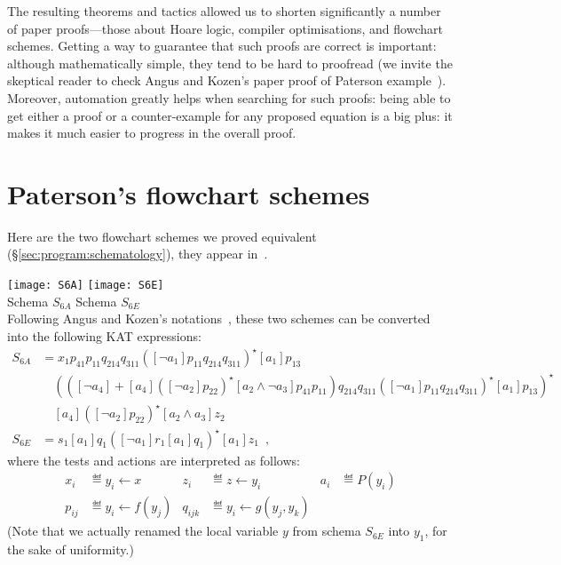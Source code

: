 \documentclass[a4paper]{llncs}
\begin{document}
The resulting theorems and tactics allowed us to shorten significantly
a number of paper proofs---those about Hoare logic, compiler
optimisations, and flowchart schemes. Getting a way to guarantee that
such proofs are correct is important: although mathematically simple,
they tend to be hard to proofread (we invite the skeptical reader to
check Angus and Kozen's paper proof of Paterson
example~\cite{angusk01:kat:schemato}).  Moreover, automation greatly
helps when searching for such proofs: being able to get either a proof
or a counter-example for any proposed equation is a big plus: it makes
it much easier to progress in the overall proof.




\clearpage
\appendix
\section{Paterson's flowchart schemes}
\label{app:paterson}

Here are the two flowchart schemes we proved equivalent
(§\ref{sec:program:schematology}), they appear
in~\cite[pages 254 and 258]{Manna74}.

\bigskip

\noindent
\texttt{[image: S6A]}
\hfill
\texttt{[image: S6E]}\\[.5em]
\mbox{}\hfill Schema $S_{6A}$ \hfill\hfill  Schema $S_{6E}$ \hfill\mbox{}\\

\smallskip\noindent
Following Angus and Kozen's notations~\cite{angusk01:kat:schemato},
these two schemes can be converted into the following KAT expressions:
\begin{align*}
  S_{6A} &= x_1 p_{41} p_{11} q_{214} q_{311}
  \left([\neg a_{1}] p_{11} q_{214} q_{311}\right)^\star [a_{1}] p_{13} \\
  &\quad \left(\left([\neg a_{4}]+[a_{4}]([\neg
      a_{2}]p_{22})^\star[a_{2}\land \neg a_{3}]p_{41}p_{11}\right)
    q_{214}q_{311} \left([\neg
      a_{1}]p_{11}q_{214}q_{311}\right)^\star[a_{1}]p_{13}\right)^\star\\
  &\quad [a_{4}]\left([\neg a_{2}]p_{22}\right)^\star[a_{2}\land a_{3}]z_{2} \\[.5em]
  S_{6E} &= s_1[a_1]q_1\left([\neg a_1]r_1[a_1]q_1\right)^\star[a_1]z_1\enspace,
\end{align*}
where the tests and actions are interpreted as follows:
\begin{align*}
  x_i &\eqdef y_i \leftarrow x &   
  z_i &\eqdef z \leftarrow y_i &
  a_i &\eqdef P(y_i) \\
  p_{ij} &\eqdef y_i \leftarrow f(y_j) &
  q_{ijk} &\eqdef y_i \leftarrow g(y_j,y_k)
\end{align*}
(Note that we actually renamed the local variable $y$ from schema
$S_{6E}$ into $y_1$, for the sake of uniformity.)
\end{document}
